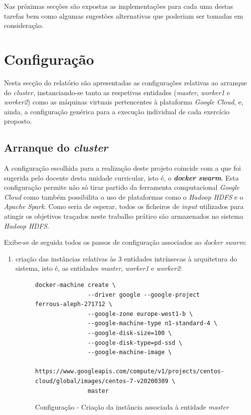 \documentclass[a4paper]{report}
\begin{document}
{    Nas próximas secções são expostas as implementações para cada uma destas tarefas bem como algumas sugestões alternativas que poderiam ser tomadas em consideração.

    \section{Configuração} \label{sec:Configuration}
        Nesta secção do relatório são apresentadas as configurações relativas ao arranque do \textit{cluster}, instanciando-se tanto as respetivas entidades (\textsl{master}, \textsl{worker1} e \textsl{worker2}) como as máquinas virtuais pertencentes à plataforma \textit{Google Cloud}, e, ainda, a configuração genérica para a execução individual de cada exercício proposto. 

        \subsection{Arranque do \textit{cluster}} \label{subsec:Configuration-Cluster}
            A configuração escolhida para a realização deste projeto coincide com a que foi sugerida pelo docente desta unidade curricular, isto é, o \textbf{\textit{docker swarm}}.
            Esta configuração permite não só tirar partido da ferramenta computacional \textit{Google Cloud} como também possibilita o uso de plataformas como o \textit{Hadoop HDFS} e o \textit{Apache Spark}.
            Como seria de esperar, todos os ficheiros de \textit{input} utilizados para atingir os objetivos traçados neste trabalho prático são armazenados no sistema \textit{Hadoop HDFS}.
            
            Exibe-se de seguida todos os passos de configuração associados ao \textit{docker swarm}:
            \begin{enumerate}[label=\textbf{\arabic*.}]
                \item criação das instâncias relativas às 3 entidades intrínsecas à arquitetura do sistema, isto é, as entidades \textsl{master}, \textsl{worker1} e \textsl{worker2}:
                \begin{figure}[H]
                    \centering
                    \begin{verbatim}
docker-machine create \
               --driver google --google-project ferrous-aleph-271712 \
               --google-zone europe-west1-b \
               --google-machine-type n1-standard-4 \
               --google-disk-size=100 \
               --google-disk-type=pd-ssd \
               --google-machine-image \
       https://www.googleapis.com/compute/v1/projects/centos-cloud/global/images/centos-7-v20200309 \
               master
                    \end{verbatim}
                    \vspace{-5mm}
                    \caption{Configuração - Criação da instância associada à entidade \textsl{master}}
                    \label{fig:1}
                \end{figure}
                

\end{enumerate}}
\end{document}
